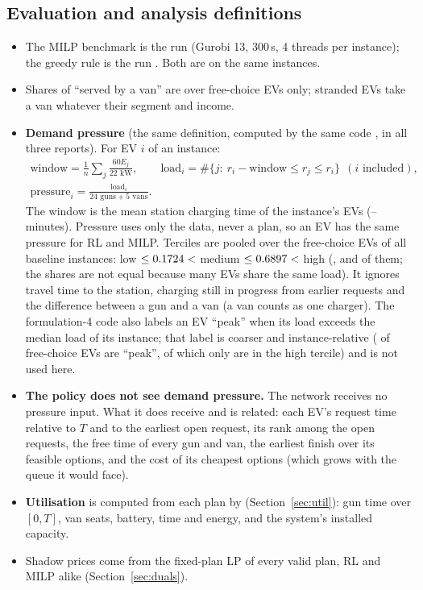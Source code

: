 \subsection{Evaluation and analysis definitions}
\label{sec:defs}
\begin{itemize}
  \item The MILP benchmark is the run  (Gurobi 13, 300\,s, 4 threads per instance); the greedy rule is the run . Both are on the same \NInst{} instances.
  \item Shares of ``served by a van'' are over free-choice EVs only; stranded EVs take a van whatever their segment and income.
  \item \textbf{Demand pressure} (the same definition, computed by the same code , in all three reports). For EV $i$ of an instance:
  \begin{gather*}\text{window}=\frac1n\sum_{j}\frac{60E_j}{22\text{ kW}},\qquad \text{load}_i=\#\{j:\ r_i-\text{window}\le r_j\le r_i\}\ \ (i\text{ included}),\\ \text{pressure}_i=\frac{\text{load}_i}{24\text{ guns}+5\text{ vans}} .\end{gather*}
  The window is the mean station charging time of the instance's EVs (\PressWindowMin--\PressWindowMax{} minutes). Pressure uses only the data, never a plan, so an EV has the same pressure for RL and MILP. Terciles are pooled over the \PressNFree{} free-choice EVs of all \NInst{} baseline instances: low $\le0.1724<$ medium $\le0.6897<$ high (\PressShareLow\pct, \PressShareMed\pct{} and \PressShareHigh\pct{} of them; the shares are not equal because many EVs share the same load).
  It ignores travel time to the station, charging still in progress from earlier requests and the difference between a gun and a van (a van counts as one charger). The formulation-4 code also labels an EV ``peak'' when its load exceeds the median load of its instance; that label is coarser and instance-relative (\PeakLabelShare\pct{} of free-choice EVs are ``peak'', of which only \PeakLabelHigh\pct{} are in the high tercile) and is not used here.
  \item \textbf{The policy does not see demand pressure.} The network receives no pressure input. What it does receive and is related: each EV's request time relative to $T$ and to the earliest open request, its rank among the open requests, the free time of every gun and van, the earliest finish over its feasible options, and the cost of its cheapest options (which grows with the queue it would face).
  \item \textbf{Utilisation} is computed from each plan by  (Section~\ref{sec:util}): gun time over $[0,T]$, van seats, battery, time and energy, and the system's installed capacity.
  \item Shadow prices come from the fixed-plan LP of every valid plan, RL and MILP alike (Section~\ref{sec:duals}).
\end{itemize}

